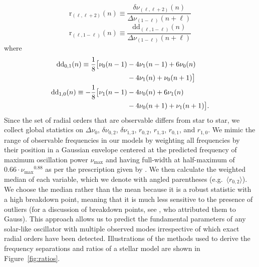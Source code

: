 \begin{equation} 
  \mathrm{r}_{(\ell,\ell+2)}(n) \equiv \frac{\delta\nu_{(\ell, \ell+2)}(n)}{\Delta\nu_{(1-\ell)}(n+\ell)} \label{eqn:LSratio}
\end{equation}
\begin{equation} 
  \mathrm{r}_{(\ell, 1-\ell)}(n) \equiv \frac{\mathrm{dd}_{(\ell,1-\ell)}(n)}{\Delta\nu_{(1-\ell)}(n+\ell)} \label{eqn:rnl}
\end{equation}
where
\begin{align} 
  \mathrm{dd}_{0,1}(n) \equiv \frac{1}{8} \big[\nu_0(n-1) &- 4\nu_1(n-1) 
                                 +6\nu_0(n) \notag\\&- 4\nu_1(n) +  \nu_0(n+1)\big]\\ 
  \mathrm{dd}_{1,0}(n) \equiv -\frac{1}{8} \big[\nu_1(n-1) &- 4\nu_0(n) 
                                 +6\nu_1(n) \notag\\&- 4\nu_0(n+1) + \nu_1(n+1)\big].
\end{align}
Since the set of radial orders that are observable differs from star to star, we collect global statistics on $\Delta\nu_0$, $\delta\nu_{0,2}$, $\delta\nu_{1,3}$, $r_{0,2}$, $r_{1,3}$, $r_{0,1}$, and $r_{1,0}$. We mimic the range of observable frequencies in our models by weighting all frequencies by their position in a Gaussian envelope centered at the predicted frequency of maximum oscillation power $\nu_{\max}$ and having full-width at half-maximum of ${0.66\cdot\nu_{\max}{}^{0.88}}$ as per the prescription given by \citet{2012A&A...537A..30M}. We then calculate the weighted median of each variable, which we denote with angled parentheses (e.g.\ $\langle r_{0,2}\rangle$). We choose the median rather than the mean because it is a robust statistic with a high breakdown point, meaning that it is much less sensitive to the presence of outliers (for a discussion of breakdown points, see \citealt{hampel1971general}, who attributed them to Gauss). This approach allows us to predict the fundamental  parameters of any solar-like oscillator with multiple observed modes irrespective of which exact radial orders have been detected. Illustrations of the methods used to derive the frequency separations and ratios of a stellar model are shown in Figure~\ref{fig:ratios}. 

